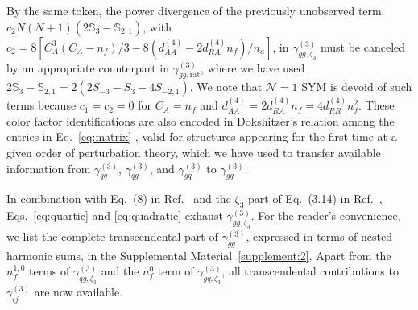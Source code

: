 \documentclass[
 twocolumn,
 superscriptaddress,
 preprintnumbers,
 nofootinbib,
 amsmath,amssymb,
 aps,
 prl
 ]{revtex4-2}
\newcommand{\BS}{\mathbb{S}}
\begin{document}
By the same token, the power divergence of the previously unobserved term $c_2N(N+1)(2\BS_3-\BS_{2,1})$, with $c_2=8[C_A^3(C_A-n_f)/3-8(d_{AA}^{(4)}-2d_{RA}^{(4)}n_f)/n_a]$, in $\gamma_{gg,\zeta_3}^{(3)}$ must be canceled by an appropriate counterpart in $\gamma_{gg,\mathrm{rat}}^{(3)}$, where we have used $2\BS_3-\BS_{2,1}=2(2S_{-3}-S_3-4S_{-2,1})$.
We note that $\mathcal{N}=1$ SYM is devoid of such terms because $c_1=c_2=0$ for $C_A=n_f$ and $d_{AA}^{(4)}=2d_{RA}^{(4)}n_f=4d_{RR}^{(4)}n_f^2$.
These color factor identifications are also encoded in Dokshitzer's relation among the entries in Eq.~\eqref{eq:matrix} \cite{Dokshitzer:1977sg,Bukhvostov:1985vj,Bukhvostov:1985rn,Belitsky:1998gu}, valid for structures appearing for the first time at a given order of perturbation theory, which we have used to transfer available information from $\gamma_{qq}^{(3)}$, $\gamma_{qg}^{(3)}$, and $\gamma_{gq}^{(3)}$ \cite{Falcioni:2023luc,Falcioni:2023vqq,Falcioni:2024xyt,Falcioni:2024qpd,Kniehl:2025jfs,Kniehl:2025ttz,Kniehl:2026axe,Gehrmann:2026qbl} to $\gamma_{gg}^{(3)}$.

In combination with Eq.~(8) in Ref.~\cite{Falcioni:2024qpd} and the $\zeta_3$ part of Eq.~(3.14) in Ref.~\cite{Davies:2016jie}, Eqs.~\eqref{eq:quartic} and \eqref{eq:quadratic} exhaust $\gamma_{gg,\zeta_3}^{(3)}$.
For the reader's convenience, we list the complete transcendental part of $\gamma_{gg}^{(3)}$, expressed in terms of nested harmonic sums, in the Supplemental Material~\ref{supplement:2}.
Apart from the $n_f^{1,0}$ terms of $\gamma_{qg,\zeta_3}^{(3)}$ and the $n_f^{0}$ term of $\gamma_{gq,\zeta_3}^{(3)}$, all transcendental contributions to $\gamma_{ij}^{(3)}$ are now available.
\end{document}
